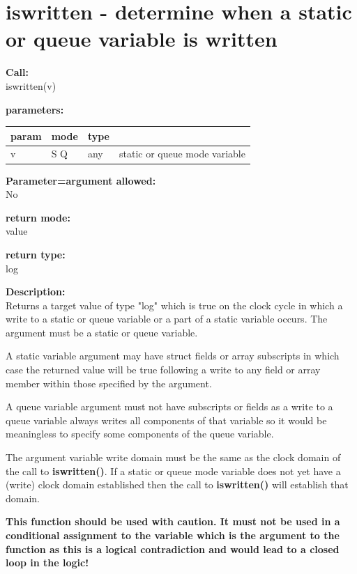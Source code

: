     \section{iswritten - determine when a static or queue variable is written}\label{sec:ifiswritten}
        
        {\bf Call:} \\
        iswritten(v)
        
        {\bf parameters:} \\
        \begin{tabular}{| l | l | l | l |}
        \hline
        param  & mode & type & \\
        \hline \hline
        v & S Q & any & static or queue mode variable \\ \hline
        \end{tabular}
        
        {\bf Parameter=argument allowed:} \\
        No
        
        {\bf return mode:} \\
        value

        {\bf return type:} \\
        log
        
        {\bf Description:} \\
        Returns a target value of type "log" which is true on the clock cycle in
        which a write to a static or queue variable or a part of a static
        variable occurs. The argument must be a static or queue variable.

        A static variable argument may have struct fields or array subscripts in
        which case the returned value will be true following a write to any
        field or array member within those specified by the argument.

        A queue variable argument must not have subscripts or fields as a write
        to a queue variable always writes all components of that variable so it
        would be meaningless to specify some components of the queue variable.

        The argument variable write domain must be the same as the clock domain
        of the call to {\bf iswritten()}. If a static or queue mode variable does
        not yet have a (write) clock domain established then the call to {\bf
        iswritten()} will establish that domain.

        {\bf This function should be used with caution. It must not be used in a
        conditional assignment to the variable which is the argument to the
        function as this is a logical contradiction and would lead to a closed
        loop in the logic!}

